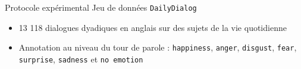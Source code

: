 \documentclass[11pt,aspectratio=169]{beamer}
\begin{document}
\begin{frame}{Protocole expérimental}
    Jeu de données \texttt{DailyDialog}~
    \begin{itemize}
        \item 13 118 dialogues dyadiques en anglais sur des sujets de la vie quotidienne
        \item<2-> Annotation au niveau du tour de parole : \texttt{happiness}, \texttt{anger}, \texttt{disgust}, \texttt{fear}, \texttt{surprise}, \texttt{sadness} et \texttt{no emotion}
    \end{itemize}

\end{frame}
\end{document}
